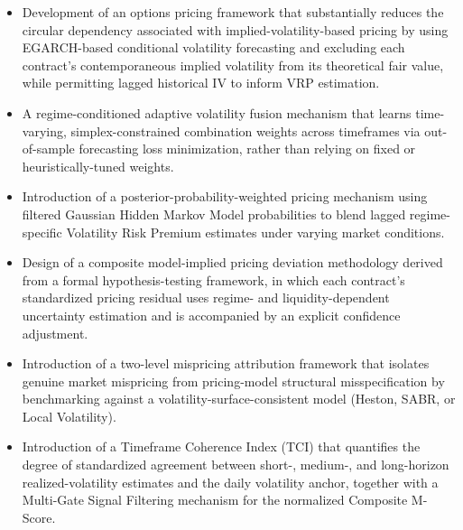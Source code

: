 \documentclass[journal]{IEEEtran}
\begin{document}
\begin{itemize}
  \item Development of an options pricing framework that substantially
    reduces the circular dependency associated with
    implied-volatility-based pricing by using EGARCH-based conditional
    volatility forecasting and excluding each contract's
    contemporaneous implied volatility from its theoretical fair value,
    while permitting lagged historical IV to inform VRP estimation.

  \item A regime-conditioned adaptive volatility fusion mechanism that
    learns time-varying, simplex-constrained combination weights across
    timeframes via out-of-sample forecasting loss minimization, rather
    than relying on fixed or heuristically-tuned weights.

  \item Introduction of a posterior-probability-weighted pricing
    mechanism using filtered Gaussian Hidden Markov Model probabilities
    to blend lagged regime-specific Volatility Risk Premium estimates
    under varying market conditions.

  \item Design of a composite model-implied pricing deviation
    methodology derived from a formal hypothesis-testing framework, in
    which each contract's standardized pricing residual uses regime-
    and liquidity-dependent uncertainty estimation and is accompanied
    by an explicit confidence adjustment.

  \item Introduction of a two-level mispricing attribution framework
    that isolates genuine market mispricing from pricing-model
    structural misspecification by benchmarking against a
    volatility-surface-consistent model (Heston, SABR, or Local
    Volatility).

  \item Introduction of a Timeframe Coherence Index (TCI) that
    quantifies the degree of standardized agreement between short-,
    medium-, and long-horizon realized-volatility estimates and the
    daily volatility anchor, together with a Multi-Gate Signal
    Filtering mechanism for the normalized Composite M-Score.
\end{itemize}
\end{document}
